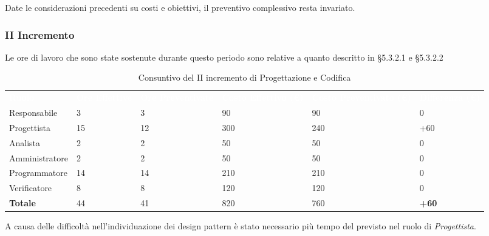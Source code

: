 Date le considerazioni precedenti su costi e obiettivi, il preventivo complessivo resta invariato.

\pagebreak


\subsubsection{II Incremento}
Le ore di lavoro che sono state sostenute durante questo periodo sono relative a quanto descritto in §5.3.2.1 e §5.3.2.2

\begin{table}[H]
\begin{center}
\renewcommand{\arraystretch}{1.5}
\begin{tabular}{ m{}<{\centering}  m{}<{\centering} m{}<{\centering} m{}<{\centering} m{}<{\centering} m{}<{\centering}}
	\rowcolor{darkblue}
	\textcolor{white}{\textbf{Ruolo}} & \textcolor{white}{\textbf{Ore Effettive}} & \textcolor{white}{\textbf{Ore Preventivate}}&\textcolor{white}{\textbf{Costo Effettivo (\euro)}}&\textcolor{white}{\textbf{Costo Preventivato (\euro)}}&\textcolor{white}{\textbf{Differenza (\euro)}}\\ 

	Responsabile  & 3 & 3 & 90 & 90 & 0\\	
	
	Progettista & 15 & 12 & 300 & 240 & +60\\
	
	Analista & 2 & 2 & 50 & 50 & 0\\
	
	Amministratore & 2 & 2 & 50 & 50 & 0\\
	
	Programmatore & 14 & 14 & 210 & 210 & 0\\
	
	Verificatore & 8 & 8 & 120 & 120 & 0\\
	
	\textbf{Totale} & 44 & 41 & 820 & 760 & \textbf{+60} \\
	
\end{tabular}
\caption{Consuntivo del II incremento di Progettazione e Codifica}
\end{center}
\end{table}

A causa delle difficoltà nell'individuazione dei design pattern è stato necessario più tempo del previsto nel ruolo di \textit{Progettista}.

